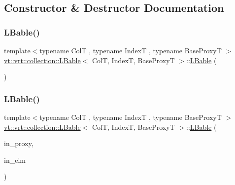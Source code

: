 \subsection{Constructor \& Destructor Documentation}
\mbox{\label{structvt_1_1vrt_1_1collection_1_1_l_bable_a974e761dc819d64c3c46216dc0034b0a}} 
\subsubsection{\texorpdfstring{L\+Bable()}{LBable()}\hspace{0.1cm}{\footnotesize\ttfamily [1/2]}}
{\footnotesize\ttfamily template$<$typename ColT , typename IndexT , typename Base\+ProxyT $>$ \\
\hyperlink{structvt_1_1vrt_1_1collection_1_1_l_bable}{vt\+::vrt\+::collection\+::\+L\+Bable}$<$ ColT, IndexT, Base\+ProxyT $>$\+::\hyperlink{structvt_1_1vrt_1_1collection_1_1_l_bable}{L\+Bable} (\begin{DoxyParamCaption}{ }\end{DoxyParamCaption})\hspace{0.3cm}{\ttfamily [default]}}

\mbox{\label{structvt_1_1vrt_1_1collection_1_1_l_bable_abf19aead7dc4f5cef1affe568a1a03d0}} 
\subsubsection{\texorpdfstring{L\+Bable()}{LBable()}\hspace{0.1cm}{\footnotesize\ttfamily [2/2]}}
{\footnotesize\ttfamily template$<$typename ColT , typename IndexT , typename Base\+ProxyT $>$ \\
\hyperlink{structvt_1_1vrt_1_1collection_1_1_l_bable}{vt\+::vrt\+::collection\+::\+L\+Bable}$<$ ColT, IndexT, Base\+ProxyT $>$\+::\hyperlink{structvt_1_1vrt_1_1collection_1_1_l_bable}{L\+Bable} (\begin{DoxyParamCaption}\item[{typename Base\+Proxy\+T\+::\+Proxy\+Type const \&}]{in\+\_\+proxy,  }\item[{typename Base\+Proxy\+T\+::\+Element\+Proxy\+Type const \&}]{in\+\_\+elm }\end{DoxyParamCaption})}



